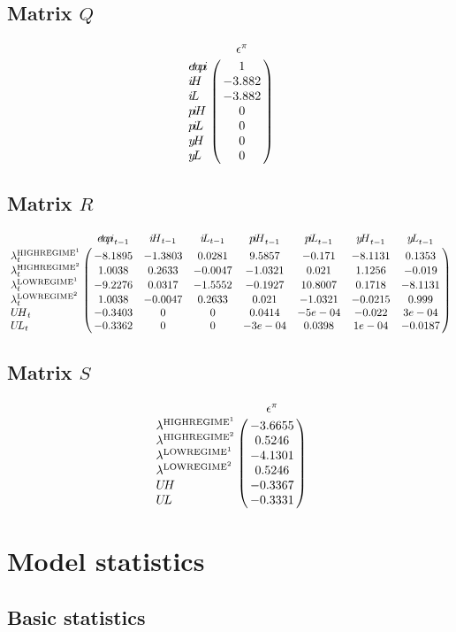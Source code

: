 \subsection*{Matrix $Q$}

$$\bordermatrix{
~ & \epsilon^{\pi} \cr
{e\!t\!a\!p\!i} & 1 \cr
{i\!H} & -3.882 \cr
{i\!L} & -3.882 \cr
{p\!i\!H} & 0 \cr
{p\!i\!L} & 0 \cr
{y\!H} & 0 \cr
{y\!L} & 0 \cr
}$$

\subsection*{Matrix $R$}

$$\bordermatrix{
~ & {e\!t\!a\!p\!i}_{t-1} & {i\!H}_{t-1} & {i\!L}_{t-1} & {p\!i\!H}_{t-1} & {p\!i\!L}_{t-1} & {y\!H}_{t-1} & {y\!L}_{t-1} \cr
\lambda^{\mathrm{HIGHREGIME}^{\mathrm{1}}}_{t} & -8.1895 & -1.3803 & 0.0281 & 9.5857 & -0.171 & -8.1131 & 0.1353 \cr
\lambda^{\mathrm{HIGHREGIME}^{\mathrm{2}}}_{t} & 1.0038 & 0.2633 & -0.0047 & -1.0321 & 0.021 & 1.1256 & -0.019 \cr
\lambda^{\mathrm{LOWREGIME}^{\mathrm{1}}}_{t} & -9.2276 & 0.0317 & -1.5552 & -0.1927 & 10.8007 & 0.1718 & -8.1131 \cr
\lambda^{\mathrm{LOWREGIME}^{\mathrm{2}}}_{t} & 1.0038 & -0.0047 & 0.2633 & 0.021 & -1.0321 & -0.0215 & 0.999 \cr
{U\!H}_{t} & -0.3403 & 0 & 0 & 0.0414 & -5e-04 & -0.022 & 3e-04 \cr
{U\!L}_{t} & -0.3362 & 0 & 0 & -3e-04 & 0.0398 & 1e-04 & -0.0187 \cr
}$$

\subsection*{Matrix $S$}

$$\bordermatrix{
~ & \epsilon^{\pi} \cr
\lambda^{\mathrm{HIGHREGIME}^{\mathrm{1}}} & -3.6655 \cr
\lambda^{\mathrm{HIGHREGIME}^{\mathrm{2}}} & 0.5246 \cr
\lambda^{\mathrm{LOWREGIME}^{\mathrm{1}}} & -4.1301 \cr
\lambda^{\mathrm{LOWREGIME}^{\mathrm{2}}} & 0.5246 \cr
{U\!H} & -0.3367 \cr
{U\!L} & -0.3331 \cr
}$$


\section{Model statistics}

\subsection{Basic statistics}

